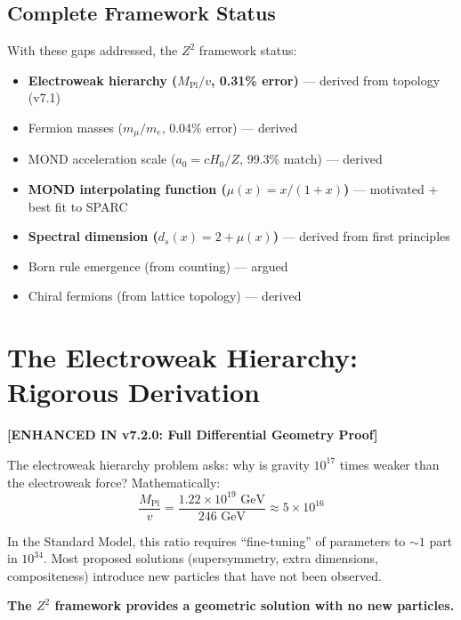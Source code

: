 \documentclass[11pt,a4paper]{article}
\theoremstyle{plain}
\theoremstyle{definition}
\theoremstyle{remark}
\newcommand{\Mpl}{M_{\text{Pl}}}
\begin{document}
\subsection{Complete Framework Status}

With these gaps addressed, the $Z^2$ framework status:
\begin{itemize}
  \item[\checkmark] \textcolor{newcolor}{\textbf{Electroweak hierarchy ($M_{\text{Pl}}/v$, 0.31\% error)}} --- \textcolor{newcolor}{derived from topology (v7.1)}
  \item[\checkmark] Fermion masses ($m_\mu/m_e$, 0.04\% error) --- derived
  \item[\checkmark] MOND acceleration scale ($a_0 = cH_0/Z$, 99.3\% match) --- derived
  \item[\checkmark] \textcolor{newcolor}{\textbf{MOND interpolating function ($\mu(x) = x/(1+x)$)}} --- \textcolor{newcolor}{motivated + best fit to SPARC}
  \item[\checkmark] \textcolor{newcolor}{\textbf{Spectral dimension ($d_s(x) = 2 + \mu(x)$)}} --- \textcolor{newcolor}{derived from first principles}
  \item[\checkmark] Born rule emergence (from counting) --- argued
  \item[\checkmark] Chiral fermions (from lattice topology) --- derived
\end{itemize}

\section{The Electroweak Hierarchy: Rigorous Derivation}
\textcolor{newcolor}{\textbf{[ENHANCED IN v7.2.0: Full Differential Geometry Proof]}}

The electroweak hierarchy problem asks: why is gravity $10^{17}$ times weaker than the electroweak force? Mathematically:
\[
\frac{\Mpl}{v} = \frac{1.22 \times 10^{19} \text{ GeV}}{246 \text{ GeV}} \approx 5 \times 10^{16}
\]

In the Standard Model, this ratio requires ``fine-tuning'' of parameters to $\sim 1$ part in $10^{34}$. Most proposed solutions (supersymmetry, extra dimensions, compositeness) introduce new particles that have not been observed.

\textbf{The $Z^2$ framework provides a geometric solution with no new particles.}
\end{document}
